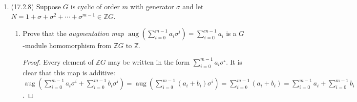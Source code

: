 \documentclass[11pt]{article}
\DeclareMathOperator{\Tor}{Tor}
\DeclareMathOperator{\im}{im}
\DeclareMathOperator{\aug}{aug}
\begin{document}
\begin{enumerate}
\begin{enumerate}
\begin{proof}
            The first homology group is \begin{multline*}
                \Tor_0^R(A,\oplus_{i\in I}B_i) = (A\otimes_R (\oplus_{i\in I}P_{i0}))/\im(1\otimes(\oplus_{i\in I}d_{i1}))\cong \oplus_{i\in I}[A\otimes_R P_{i0}]/[\im(1\otimes d_{i1})]\\ =\oplus_{i\in I}\Tor_0^R(A,B_i)
            \end{multline*} and the others are \begin{multline*}
                \Tor_n^R(A,\oplus_{i\in I}B_i) = \ker(1\otimes(\oplus_{i\in I}d_{in}))/\im(1\otimes(\oplus_{i\in I}d_{i(n+1)}))\cong \oplus_{i\in I}[\ker(1\otimes d_{in})]/[\im(1\otimes d_{i(n+1)})]\\ =\oplus_{i\in I}\Tor_n^R(A,B_i).
            \end{multline*}
        \end{proof}
    \end{enumerate}
    \item (17.2.8) Suppose $G$ is cyclic of order $m$ with generator $\sigma$ and let $N = 1+\sigma + \sigma^2 + \cdots + \sigma^{m-1}\in\mathbb{Z}G$.\begin{enumerate}
        \item Prove that the \textit{augmentation map} $\aug(\sum_{i=0}^{m-1}a_i\sigma^i) = \sum_{i=0}^{m-1}a_i$ is a $G$-module homomorphism from $\mathbb{Z}G$ to $\mathbb{Z}$. \begin{proof}
            Every element of $\mathbb{Z}G$ may be written in the form $\sum_{i=0}^{m-1}a_i\sigma^i$. It is clear that this map is additive: $\aug(\sum_{i=0}^{m-1}a_i\sigma^i + \sum_{i=0}^{m-1}b_i\sigma^i) = \aug(\sum_{i=0}^{m-1}(a_i+b_i)\sigma^i) = \sum_{i=0}^{m-1}(a_i+b_i) = \sum_{i=0}^{m-1}a_i+\sum_{i=0}^{m-1}b_i = \aug(\sum_{i=0}^{m-1}a_i\sigma^i) + \aug(\sum_{i=0}^{m-1}b_i\sigma^i)$.
            

\end{proof}
\end{enumerate}
\end{enumerate}
\end{document}
